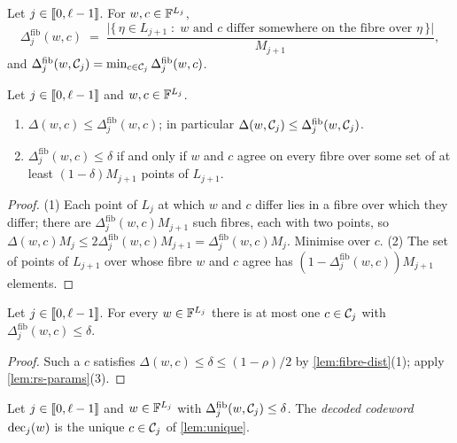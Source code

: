 \begin{definition}\label{def:fibre-dist}
Let $j \in \llbracket 0, \ell-1 \rrbracket$. For $w, c \in \mathbb{F}^{L_j}$,
\[
  \Delta^{\mathrm{fib}}_j(w,c) \;=\; \frac{\bigl|\{\, \eta \in L_{j+1} \;:\; w \text{ and } c \text{ differ somewhere on the fibre over } \eta \,\}\bigr|}{M_{j+1}},
\]
and $\Delta^{\mathrm{fib}}_j(w, \mathcal{C}_j) = \min_{c \in \mathcal{C}_j} \Delta^{\mathrm{fib}}_j(w,c)$.
\end{definition}

\begin{lemma}\label{lem:fibre-dist}
Let $j \in \llbracket 0, \ell-1 \rrbracket$ and $w, c \in \mathbb{F}^{L_j}$.
\begin{enumerate}
  \item $\Delta(w,c) \le \Delta^{\mathrm{fib}}_j(w,c)$; in particular $\Delta(w,\mathcal{C}_j) \le \Delta^{\mathrm{fib}}_j(w,\mathcal{C}_j)$.
  \item $\Delta^{\mathrm{fib}}_j(w,c) \le \delta$ if and only if $w$ and $c$ agree on every fibre over some set of at least $(1-\delta)M_{j+1}$ points of $L_{j+1}$.
\end{enumerate}
\end{lemma}

\begin{proof}
(1) Each point of $L_j$ at which $w$ and $c$ differ lies in a fibre over which they differ; there are $\Delta^{\mathrm{fib}}_j(w,c)M_{j+1}$ such fibres, each with two points, so $\Delta(w,c)M_j \le 2\Delta^{\mathrm{fib}}_j(w,c)M_{j+1} = \Delta^{\mathrm{fib}}_j(w,c)M_j$. Minimise over $c$.
(2) The set of points of $L_{j+1}$ over whose fibre $w$ and $c$ agree has $(1 - \Delta^{\mathrm{fib}}_j(w,c))M_{j+1}$ elements.
\end{proof}

\begin{lemma}\label{lem:unique}
Let $j \in \llbracket 0, \ell-1 \rrbracket$. For every $w \in \mathbb{F}^{L_j}$ there is at most one $c \in \mathcal{C}_j$ with $\Delta^{\mathrm{fib}}_j(w,c) \le \delta$.
\end{lemma}

\begin{proof}
Such a $c$ satisfies $\Delta(w,c) \le \delta \le (1-\rho)/2$ by \cref{lem:fibre-dist}(1); apply \cref{lem:rs-params}(3).
\end{proof}

\begin{definition}\label{def:decoded}
Let $j \in \llbracket 0, \ell-1 \rrbracket$ and $w \in \mathbb{F}^{L_j}$ with $\Delta^{\mathrm{fib}}_j(w, \mathcal{C}_j) \le \delta$. The \emph{decoded codeword} $\mathrm{dec}_j(w)$ is the unique $c \in \mathcal{C}_j$ of \cref{lem:unique}.
\end{definition}

